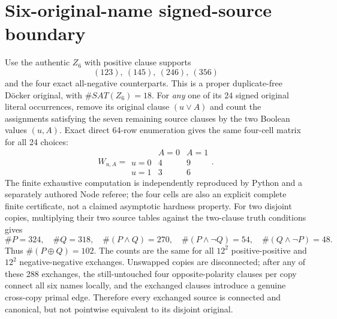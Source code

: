 \documentclass[11pt]{article}
\begin{document}
\section{Six-original-name signed-source boundary}
Use the authentic $Z_6$ with positive clause supports
\[
 (123),\ (145),\ (246),\ (356)
\]
and the four exact all-negative counterparts. This is a proper duplicate-free D\"ocker original, with $\#SAT(Z_6)=18$. For \emph{any} one of its $24$ signed original literal occurrences, remove its original clause $(u\vee A)$ and count the assignments satisfying the seven remaining source clauses by the two Boolean values $(u,A)$. Exact direct 64-row enumeration gives the same four-cell matrix for all 24 choices:
\begin{equation}\label{eq:W}
 W_{u,A}=\begin{array}{c|cc}&A=0&A=1\\\hline u=0&4&9\\u=1&3&6\end{array}.
\end{equation}
The finite exhaustive computation is independently reproduced by Python and a separately authored Node referee; the four cells are also an explicit complete finite certificate, not a claimed asymptotic hardness property. For two disjoint copies, multiplying their two source tables against the two-clause truth conditions gives
\[
 \#P=324,\quad \#Q=318,\quad \#(P\wedge Q)=270,\quad
 \#(P\wedge\neg Q)=54,\quad\#(Q\wedge\neg P)=48.
\]
Thus $\#(P\oplus Q)=102$. The counts are the same for all $12^2$ positive-positive and $12^2$ negative-negative exchanges. Unswapped copies are disconnected; after any of these 288 exchanges, the still-untouched four opposite-polarity clauses per copy connect all six names locally, and the exchanged clauses introduce a genuine cross-copy primal edge. Therefore every exchanged source is connected and canonical, but not pointwise equivalent to its disjoint original.
\end{document}
